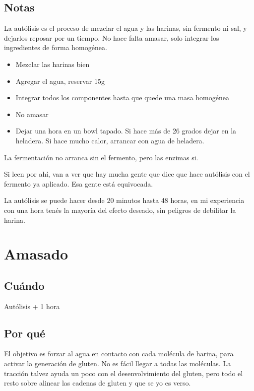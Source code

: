 \documentclass[10pt,a4paper]{article}
\begin{document}
\subsection*{Notas}
La autólisis es el proceso de mezclar el agua y las harinas, sin fermento ni
sal, y dejarlos reposar por un tiempo. No hace falta amasar, solo integrar los
ingredientes de forma homogénea.

\begin{itemize}
\item Mezclar las harinas bien
\item Agregar el agua, reservar 15g
\item Integrar todos los componentes hasta que quede una masa homogénea
\item No amasar
\item Dejar una hora en un bowl tapado. Si hace más de 26 grados dejar en la
  heladera. Si hace mucho calor, arrancar con agua de heladera.
\end{itemize}

La fermentación no arranca sin el fermento, pero las enzimas si.

Si leen por ahí, van a ver que hay mucha gente que dice que hace autólisis con
el fermento ya aplicado. Esa gente está equivocada.

La autólisis se puede hacer desde 20 minutos hasta 48 horas, en mi
experiencia con una hora tenés la mayoría del efecto deseado, sin
peligros de debilitar la harina.

\section{Amasado}
\subsection*{Cuándo}
Autólisis + 1 hora

\subsection*{Por qué}
El objetivo es forzar al agua en contacto con cada molécula
de harina, para activar la generación de gluten. No es fácil
llegar a todas las moléculas. La tracción talvez ayuda un poco
con el desenvolvimiento del gluten, pero todo el resto sobre alinear
las cadenas de gluten y que se yo es verso.
\end{document}
